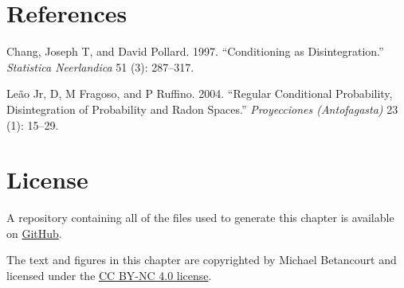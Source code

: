 \documentclass[
  letterpaper,
  DIV=11,
  numbers=noendperiod]{scrartcl}
\newlength{\cslhangindent}
\newenvironment{CSLReferences}[2] %
 {\begin{list}{}{%
  \setlength{\itemindent}{0pt}
  \setlength{\leftmargin}{0pt}
  \setlength{\parsep}{0pt}
  \ifodd #1
   \setlength{\leftmargin}{\cslhangindent}
   \setlength{\itemindent}{-1\cslhangindent}
  \fi
  \setlength{\itemsep}{#2\baselineskip}}}
 {\end{list}}
\begin{document}
\section*{References}\label{references}

\label{refs}
\begin{CSLReferences}{1}{0}
Chang, Joseph T, and David Pollard. 1997. {``Conditioning as
Disintegration.''} \emph{Statistica Neerlandica} 51 (3): 287--317.

Leão Jr, D, M Fragoso, and P Ruffino. 2004. {``Regular Conditional
Probability, Disintegration of Probability and {R}adon Spaces.''}
\emph{Proyecciones (Antofagasta)} 23 (1): 15--29.

\end{CSLReferences}

\section*{License}\label{license}

A repository containing all of the files used to generate this chapter
is available on
\href{https://github.com/betanalpha/quarto_chapters/tree/main/8_conditional_probability_theory}{GitHub}.

The text and figures in this chapter are copyrighted by Michael
Betancourt and licensed under the
\href{https://creativecommons.org/licenses/by-nc/4.0/}{CC BY-NC 4.0
license}.
\end{document}
